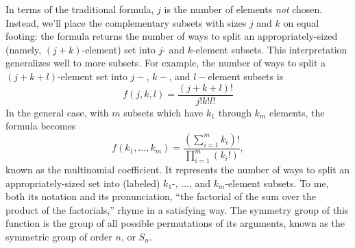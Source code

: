 \documentclass{article}
\begin{document}
  In terms of the traditional formula,
  $j$ is the number of elements \textit{not} chosen.
  Instead, we'll place the complementary subsets
  with sizes $j$ and $k$ on equal footing: the formula returns
  the number of ways to split an appropriately-sized (namely, $(j+k)$-element) set
  into $j$- and $k$-element subsets.
  This interpretation generalizes well to more subsets.
  For example, the number of ways to split a $(j+k+l)$-element set
  into $j-$, $k-$, and $l-$element subsets is
  \[f(j, k, l) = \frac{(j+k+l)!}{j!k!l!}\]
  In the general case, with $m$ subsets which have $k_1$ through $k_m$ elements,
  the formula becomes
  \[f(k_1, \ldots, k_m) = \frac{\left(\sum\limits_{i=1}^{m}k_i\right)!}{\prod\limits_{i=1}^{m}\left(k_i!\right)},\]
  known as the multinomial coefficient.
  It represents
  the number of ways to split an appropriately-sized set
  into (labeled) $k_1$-, ..., and $k_m$-element subsets.
  To me, both its notation and its pronunciation,
  ``the factorial of the sum over the product of the factorials,''
  rhyme in a satisfying way.
  The symmetry group of this function
  is the group of all possible permutations of its arguments,
  known as the symmetric group of order $n$, or $S_n$.\\
\end{document}
